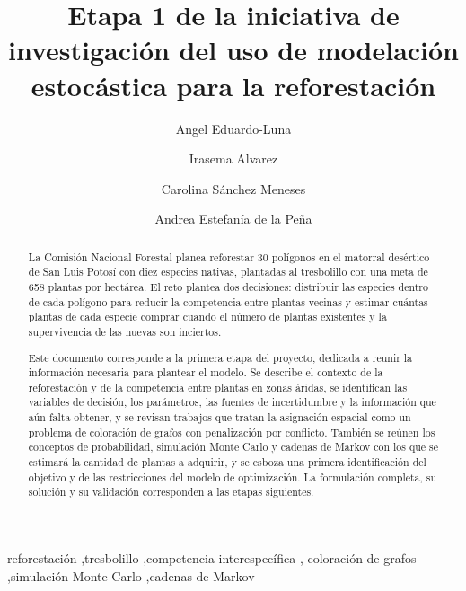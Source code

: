 \documentclass[5p,nonatbib]{elsarticle}
\theoremstyle{definition}
\begin{document}

\begin{frontmatter}

\title{Etapa 1 de la iniciativa de investigación del uso de modelación estocástica para la reforestación}

\author[tec]{Angel Eduardo-Luna}
\author[tec]{Irasema Alvarez}
\author[tec]{Carolina Sánchez Meneses}
\author[tec]{Andrea Estefanía de la Peña}
\address[tec]{Instituto Tecnológico y de Estudios Superiores de Monterrey, MA2004B--- Grupo 202, equipo 5}

\begin{abstract}
La Comisión Nacional Forestal planea reforestar 30 polígonos en el matorral
desértico de San Luis Potosí con diez especies nativas, plantadas al
tresbolillo con una meta de 658 plantas por hectárea. El reto plantea dos
decisiones: distribuir las especies dentro de cada polígono para reducir la
competencia entre plantas vecinas y estimar cuántas plantas de cada especie
comprar cuando el número de plantas existentes y la supervivencia de las
nuevas son inciertos.

Este documento corresponde a la primera etapa del proyecto, dedicada a
reunir la información necesaria para plantear el modelo. Se describe el
contexto de la reforestación y de la competencia entre plantas en zonas
áridas, se identifican las variables de decisión, los parámetros, las
fuentes de incertidumbre y la información que aún falta obtener, y se
revisan trabajos que tratan la asignación espacial como un problema de
coloración de grafos con penalización por conflicto. También se reúnen los
conceptos de probabilidad, simulación Monte Carlo y cadenas de Markov con
los que se estimará la cantidad de plantas a adquirir, y se esboza una
primera identificación del objetivo y de las restricciones del modelo de
optimización. La formulación completa, su solución y su validación
corresponden a las etapas siguientes.
\end{abstract}

\begin{keyword}
reforestación \sep tresbolillo \sep competencia interespecífica \sep
coloración de grafos \sep simulación Monte Carlo \sep cadenas de Markov
\end{keyword}
\end{frontmatter}
\end{document}
